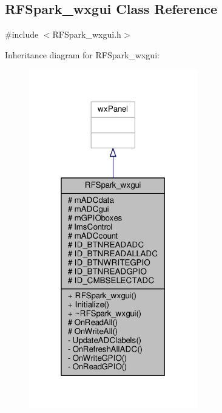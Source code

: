 \subsection{R\+F\+Spark\+\_\+wxgui Class Reference}
\label{classRFSpark__wxgui}


{\ttfamily \#include $<$R\+F\+Spark\+\_\+wxgui.\+h$>$}



Inheritance diagram for R\+F\+Spark\+\_\+wxgui\+:
\nopagebreak
\begin{figure}[H]
\begin{center}
\leavevmode
\includegraphics[width=208pt]{d9/d47/classRFSpark__wxgui__inherit__graph}
\end{center}
\end{figure}


